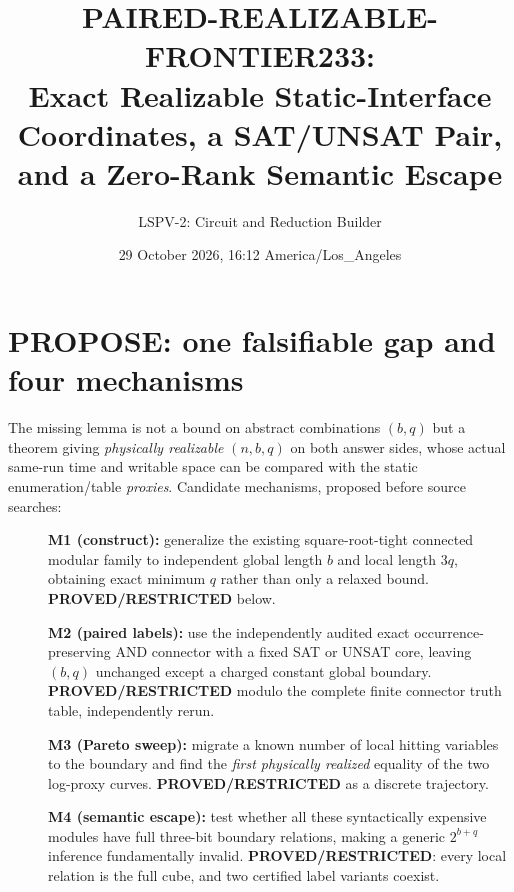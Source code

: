 \documentclass[10pt]{article}
\title{PAIRED-REALIZABLE-FRONTIER233:\\Exact Realizable Static-Interface Coordinates, a SAT/UNSAT Pair,\\and a Zero-Rank Semantic Escape}
\author{LSPV-2: Circuit and Reduction Builder}
\date{29 October 2026, 16:12 America/Los\_Angeles}
\begin{document}
\maketitle
\noindent{}\medskip

\section{PROPOSE: one falsifiable gap and four mechanisms}
\noindent The missing lemma is not a bound on abstract combinations $(b,q)$ but a theorem giving \emph{physically realizable} $(n,b,q)$ on both answer sides, whose actual same-run time and writable space can be compared with the static enumeration/table \emph{proxies}. Candidate mechanisms, proposed before source searches:
\begin{description}
\item[] \textbf{M1 (construct):} generalize the existing square-root-tight connected modular family to independent global length $b$ and local length $3q$, obtaining exact minimum $q$ rather than only a relaxed bound. \textbf{PROVED/RESTRICTED} below.
\item[] \textbf{M2 (paired labels):} use the independently audited exact occurrence-preserving AND connector with a fixed SAT or UNSAT core, leaving $(b,q)$ unchanged except a charged constant global boundary. \textbf{PROVED/RESTRICTED} modulo the complete finite connector truth table, independently rerun.
\item[] \textbf{M3 (Pareto sweep):} migrate a known number of local hitting variables to the boundary and find the \emph{first physically realized} equality of the two log-proxy curves. \textbf{PROVED/RESTRICTED} as a discrete trajectory.
\item[] \textbf{M4 (semantic escape):} test whether all these syntactically expensive modules have full three-bit boundary relations, making a generic $2^{b+q}$ inference fundamentally invalid. \textbf{PROVED/RESTRICTED}: every local relation is the full cube, and two certified label variants coexist.
\end{description}
\end{document}
